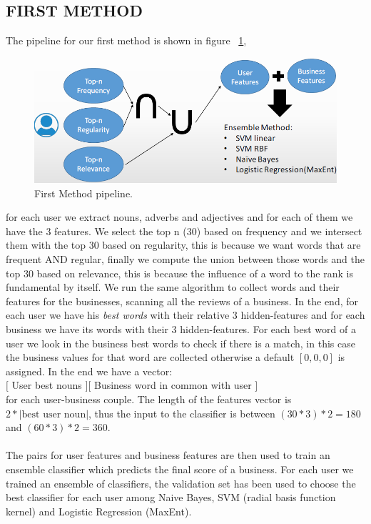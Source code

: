 \documentclass[11pt]{article}
\begin{document}
\subsection{FIRST METHOD}
The pipeline for our first method is shown in figure ~\ref{first},
\begin{figure}[thpb]
	\includegraphics[scale=0.32]{img/firstMethod.png}
	\caption{First Method pipeline.}
	\label{first}
\end{figure}	
for each user we extract nouns, adverbs and adjectives and for each of them 
 we have the 3 features. We select the top n (30) based on frequency and we intersect them with the top 30 based on regularity, this is because we want words that are frequent AND regular, finally we compute the union between those words and the top 30 based on relevance, this is because the influence of a word to the rank is fundamental by itself. 
We run the same algorithm to collect words and their features for the businesses, scanning all the reviews of a business.
In the end, for each user we have his\textit{ best words} with their relative 3 hidden-features and for each business we have its words with their 3 hidden-features. For each best word of a user we look in the business best words to check if there is a match, in this case the business values for that word are collected otherwise a default $[0,0,0]$ is assigned.
In the end we have a vector:\\
$[$ User best nouns $]  [$ Business word in common with user $]$\\
for each user-business couple.
The length of the features vector is $2 * |\text{best user noun}|$, thus the input to the classifier is between $(30*3)*2=180$ and $(60*3)*2=360$.\\\\
The pairs for user features and business features are then used to train an ensemble classifier which predicts the final score of a business.
For each user we trained an ensemble of classifiers, the validation set has been used to choose the best classifier for each user among Naive Bayes, SVM (radial basis function kernel) and Logistic Regression (MaxEnt).
\end{document}
